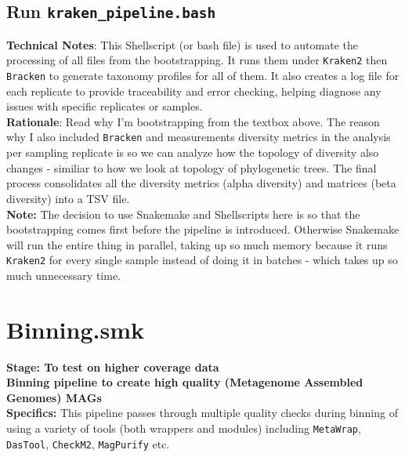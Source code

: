 \documentclass[11pt]{report}
\begin{document}
\subsection{Run \texttt{kraken\_pipeline.bash}}
\textbf{Technical Notes}: This Shellscript (or bash file) is used to automate the processing of all files from the bootstrapping. It runs them under \texttt{Kraken2} then \texttt{Bracken} to generate taxonomy profiles for all of them. It also creates a log file for each replicate to provide traceability and error checking, helping diagnose any issues with specific replicates or samples. \\
\textbf{Rationale}: Read why I'm bootstrapping from the textbox above. The reason why I also included \texttt{Bracken} and measurements diversity metrics in the analysis per sampling replicate is so we can analyze how the topology of diversity also changes - similiar to how we look at topology of phylogenetic trees. The final process consolidates all the diversity metrics (alpha diversity) and matrices (beta diversity) into a TSV file.
\\ \textbf{Note:} The decision to use Snakemake and Shellscripts here is so that the bootstrapping comes first before the pipeline is introduced. Otherwise Snakemake will run the entire thing in parallel, taking up so much memory because it runs \texttt{Kraken2} for every single sample instead of doing it in batches - which takes up so much unnecessary time. 

\newpage
\linenumbers*
\section{Binning.smk}
\textbf{Stage: To test on higher coverage data} \\   
\textbf{Binning pipeline to create high quality (Metagenome Assembled Genomes) MAGs} \\
\textbf{Specifics:} This pipeline passes through multiple quality checks during binning of using a variety of tools (both wrappers and modules) including \texttt{MetaWrap}, \texttt{DasTool}, \texttt{CheckM2}, \texttt{MagPurify} etc. 
\end{document}
